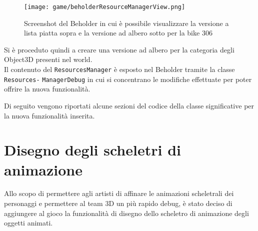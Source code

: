 	\begin{figure}[h!] 
		\centering 
		\hspace*{-0.05\columnwidth}\texttt{[image: game/beholderResourceManagerView.png]} 
		\caption{Screenshot del Beholder in cui è possibile visualizzare la versione a lista piatta sopra e la versione ad albero sotto per la bike 306}
		\label{fig:resource-manager-tree-view}
	\end{figure}
	
	Si è proceduto quindi a creare una versione ad albero per la categoria degli Object3D presenti nel world.\\
	
	Il contenuto del \texttt{ResourcesManager} è esposto nel Beholder tramite la classe \texttt{Resources-} \texttt{ManagerDebug} in cui si concentrano le modifiche effettuate per poter offrire la nuova funzionalità.
	
	Di seguito vengono riportati alcune sezioni del codice della classe significative per la nuova funzionalità inserita.
	
	
	
	
	
	

\section{Disegno degli scheletri di animazione}
	
	Allo scopo di permettere agli artisti di affinare le animazioni scheletrali dei personaggi e permettere al team 3D un più rapido debug, è stato deciso di aggiungere al gioco la funzionalità di disegno dello scheletro di animazione degli oggetti animati.\\
	
